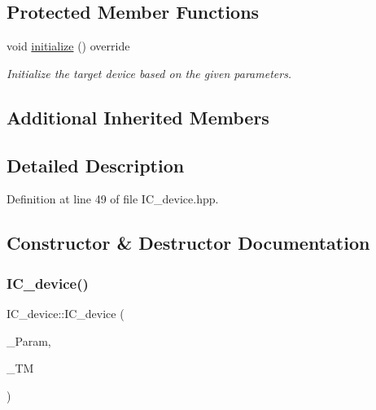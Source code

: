 \subsection*{Protected Member Functions}
\begin{DoxyCompactItemize}
\item 
void \hyperlink{classIC__device_a7f816b4ac2c63f1384bbbcea096505a8}{initialize} () override
\begin{DoxyCompactList}\small\item\em Initialize the target device based on the given parameters. \end{DoxyCompactList}\end{DoxyCompactItemize}
\subsection*{Additional Inherited Members}


\subsection{Detailed Description}


Definition at line 49 of file I\+C\+\_\+device.\+hpp.



\subsection{Constructor \& Destructor Documentation}
\mbox{\label{classIC__device_a6550c4f2687612ea1e72d0be518b8bb4}} 
\subsubsection{\texorpdfstring{I\+C\+\_\+device()}{IC\_device()}}
{\footnotesize\ttfamily I\+C\+\_\+device\+::\+I\+C\+\_\+device (\begin{DoxyParamCaption}\item[{const \hyperlink{Parameter_8hpp_a37841774a6fcb479b597fdf8955eb4ea}{Parameter\+Const\+Ref}}]{\+\_\+\+Param,  }\item[{const \hyperlink{technology__manager_8hpp_a4b9ecd440c804109c962654f9227244e}{technology\+\_\+manager\+Ref}}]{\+\_\+\+TM }\end{DoxyParamCaption})}




